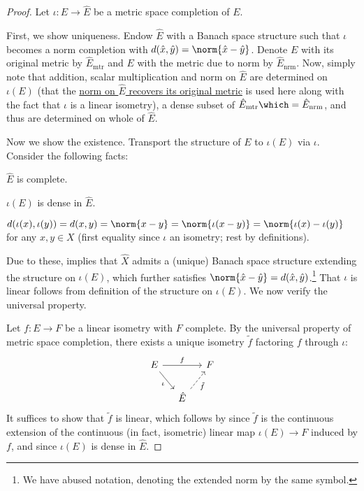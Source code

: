 	\begin{proof}
		Let $\iota\colon E\to\hat E$ be a metric space completion of $E$.
		
		First, we show uniqueness. Endow $\hat E$ with a Banach space structure such that $\iota$ becomes a norm completion with $d(\hat x, \hat y) = \norm{\hat x - \hat y}$. Denote $E$ with its original metric by $\hat E_\text{mtr}$ and $E$ with the metric due to norm by $\hat E_\text{nrm}$. Now, simply note that addition, scalar multiplication and norm on $\hat E$ are determined on $\iota(E)$ (that the \uline{norm on $\hat E$ recovers its original metric} is used here along with the fact that $\iota$ is a linear isometry), a dense subset of $\hat E_\text{mtr}\which=\hat E_\text{nrm}$, and thus are determined on whole of $\hat E$.
		
		Now we show the existence. Transport the \NLS structure of $E$ to $\iota(E)$ via $\iota$. Consider the following facts:
		\begin{mylist}
			\item $\hat E$ is complete.
			\item $\iota(E)$ is dense in $\hat E$.
			\item $d(\iota(x), \iota(y)) = d(x, y) = \norm{x - y} = \norm{\iota(x - y)} = \norm{\iota(x) - \iota(y)}$ for any $x, y\in X$ (first equality since $\iota$ an isometry; rest by definitions).
		\end{mylist}
		Due to these,  implies that $\hat X$ admits a (unique) Banach space structure extending the \NLS structure on $\iota(E)$, which further satisfies $\norm{\hat x - \hat y} = d(\hat x, \hat y)$.\footnote{
			We have abused notation, denoting the extended norm by the same symbol.
		} That $\iota$ is linear follows from definition of the \NLS structure on $\iota(E)$. We now verify the universal property.
		
		Let $f\colon E\to F$ be a linear isometry with $F$ complete. By the universal property of metric space completion, there exists a unique isometry $\tilde f$ factoring $f$ through $\iota$:
		\[
		\begin{tikzcd}[column sep=small]
			E\ar[rr, "f"]\ar[dr, "\iota"'] & & F\\
			& \hat E\ar[ur, dashed, "\tilde f"'] &
		\end{tikzcd}
		\]
		It suffices to show that $\tilde f$ is linear, which follows by  since $\tilde f$ is the continuous extension of the continuous (in fact, isometric) linear map $\iota(E)\to F$ induced by $f$, and since $\iota(E)$ is dense in $\hat E$.
	\end{proof}
	

